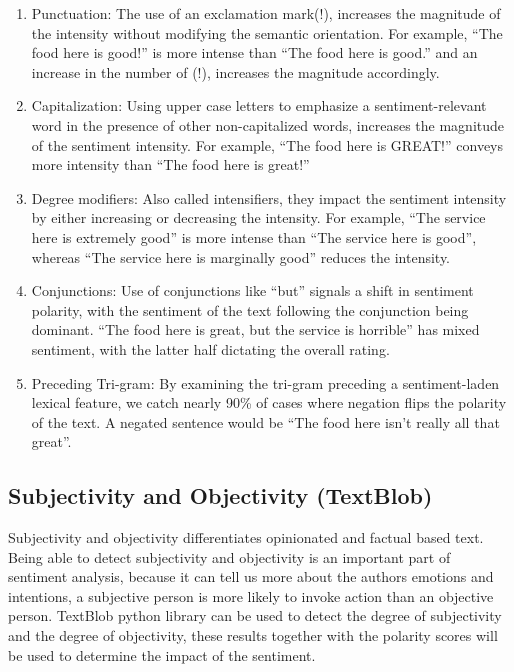 \begin{enumerate}

\item
Punctuation: The use of an exclamation mark(!), increases the magnitude of the intensity without modifying the semantic orientation. For example, “The food here is good!” is more intense than “The food here is good.” and an increase in the number of (!), increases the magnitude accordingly.

\item
Capitalization: Using upper case letters to emphasize a sentiment-relevant word in the presence of other non-capitalized words, increases the magnitude of the sentiment intensity. For example, “The food here is GREAT!” conveys more intensity than “The food here is great!”
\item
Degree modifiers: Also called intensifiers, they impact the sentiment intensity by either increasing or decreasing the intensity. For example, “The service here is extremely good” is more intense than “The service here is good”, whereas “The service here is marginally good” reduces the intensity.
\item
Conjunctions: Use of conjunctions like “but” signals a shift in sentiment polarity, with the sentiment of the text following the conjunction being dominant. “The food here is great, but the service is horrible” has mixed sentiment, with the latter half dictating the overall rating.
\item
Preceding Tri-gram: By examining the tri-gram preceding a sentiment-laden lexical feature, we catch nearly 90\% of cases where negation flips the polarity of the text. A negated sentence would be “The food here isn’t really all that great”.
\end{enumerate}

\clearpage
\subsection{Subjectivity and Objectivity (TextBlob)}
Subjectivity and objectivity differentiates opinionated and factual based text.\cite{ref2}
Being able to detect subjectivity and objectivity is an important part of sentiment analysis, because it can tell us more about the authors emotions and intentions, a subjective person is more likely to invoke action than an objective person. TextBlob python library can be used to detect the degree of subjectivity and the degree of objectivity, these results together with the polarity scores will be used to determine the impact of the sentiment. 

